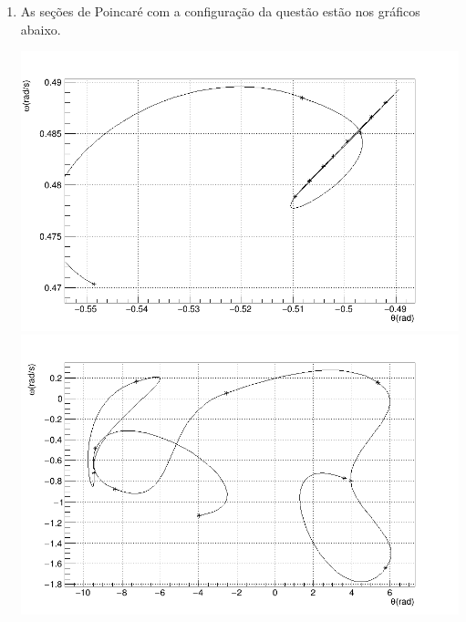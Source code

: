 \documentclass[main.tex]{subfiles}
\begin{document}
\begin{enumerate}[label=\textbf{\alph*)}]
\begin{center}
    \end{center}
    \item As seções de Poincaré com a configuração da questão estão nos gráficos abaixo.
    \begin{center}
        \includegraphics[scale=0.15]{../q2/alpha0.5/plots/poincare_RK.png}
        \includegraphics[scale=0.15]{../q2/alpha1.2/plots/poincare_RK.png}


\end{center}
\end{enumerate}
\end{document}
